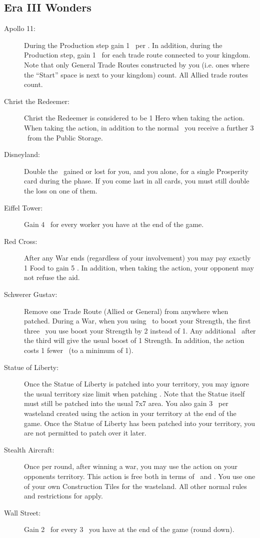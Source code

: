 \documentclass[10pt,twocolumn]{article}
\begin{document}
\begin{appendices}
\subsection{Era III Wonders}
\begin{description}
\item[Apollo 11:] During the Production step gain 1 \vp\ per \tra. In addition, during the Production step, gain 1 \vp\ for each trade route connected to your kingdom. Note that only General Trade Routes constructed by you (i.e. ones where the ``Start'' space is next to your kingdom) count. All Allied trade routes count.
\item[Christ the Redeemer:] Christ the Redeemer is considered to be 1 Hero when taking the  action. When taking the  action, in addition to the normal \vps\ you receive a further 3 \vps\ from the Public Storage.
\item[Disneyland:] Double the \vps\ gained or lost for you, and you alone, for a single Prosperity card during the  phase. If you come last in all cards, you must still double the loss on one of them.
\item[Eiffel Tower:] Gain 4 \vps\ for every worker you have at the end of the game.
\item[Red Cross:] After any War ends (regardless of your involvement) you may pay exactly 1 Food to gain 5 \vps. In addition, when taking the  action, your opponent may not refuse the aid.
\item[Schwerer Gustav:] Remove one Trade Route (Allied or General) from anywhere when patched. During a War, when you using \minerals\ to boost your Strength, the first three \minerals\ you use boost your Strength by 2 instead of 1. Any additional \minerals\ after the third will give the usual boost of 1 Strength. In addition, the  action costs 1 fewer \polfs\ (to a minimum of 1).
\item[Statue of Liberty:] Once the Statue of Liberty is patched into your territory, you may ignore the usual territory size limit when patching \landcards. Note that the Statue itself must still be patched into the usual 7x7 area. You also gain 3 \vps\ per wasteland created using the  action in your territory at the end of the game. Once the Statue of Liberty has been patched into your territory, you are not permitted to patch over it later.
\item[Stealth Aircraft:] Once per round, after winning a war, you may use the  action on your opponents territory. This action is free both in terms of \goods\ and \polfs. You use one of your own Construction Tiles for the wasteland. All other normal rules and restrictions for  apply.
\item[Wall Street:] Gain 2 \vps\ for every 3 \money\ you have at the end of the game (round down).
\end{description}

\end{appendices}
\end{document}

